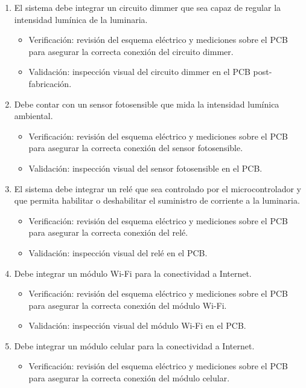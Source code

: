 \documentclass[
11pt, %
]{charter}
\begin{document}
\begin{enumerate}
\begin{enumerate}
\begin{itemize}
				\end{itemize}
 			\item El sistema debe integrar un circuito dimmer que sea capaz de regular la intensidad lumínica de la luminaria.
				\begin{itemize}
				\item Verificación: revisión del esquema eléctrico y mediciones sobre el PCB para asegurar la correcta conexión del circuito dimmer.
				\item Validación: inspección visual del circuito dimmer en el PCB post-fabricación.
				\end{itemize}
			\item Debe contar con un sensor fotosensible que mida la intensidad lumínica ambiental.
				\begin{itemize}
				\item Verificación:  revisión del esquema eléctrico y mediciones sobre el PCB para asegurar la correcta conexión del sensor fotosensible. 
				\item Validación:  inspección visual del sensor fotosensible en el PCB.
				\end{itemize}
			\item El sistema debe integrar un relé que sea controlado por el microcontrolador y que permita habilitar o deshabilitar el suministro de corriente a la luminaria.
				\begin{itemize}
				\item Verificación: revisión del esquema eléctrico y mediciones sobre el PCB para asegurar la correcta conexión del relé.
				\item Validación: inspección visual del relé en el PCB.
				\end{itemize}
			\item Debe integrar un módulo Wi-Fi para la conectividad a Internet.
				\begin{itemize}
				\item Verificación: revisión del esquema eléctrico y mediciones sobre el PCB para asegurar la correcta conexión del módulo Wi-Fi. 
				\item Validación: inspección visual del módulo Wi-Fi en el PCB.
				\end{itemize}
			\item Debe integrar un módulo celular para la conectividad a Internet.
				\begin{itemize}
				\item Verificación: revisión del esquema eléctrico y mediciones sobre el PCB para asegurar la correcta conexión del módulo celular. 

\end{itemize}
\end{enumerate}
\end{enumerate}
\end{document}
